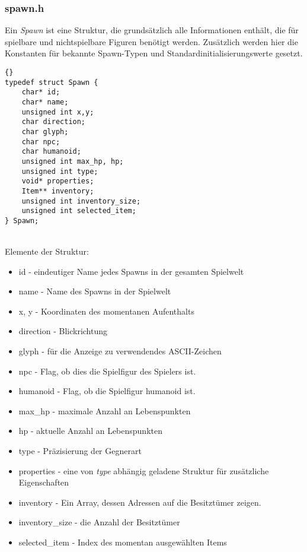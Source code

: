 \documentclass[11pt,a4paper,notitlepage]{report}
\begin{document}
	\newpage
	\subsubsection*{spawn.h}
	Ein \textit{Spawn} ist eine Struktur, die grundsätzlich alle Informationen enthält, die für spielbare und nichtspielbare Figuren benötigt werden. Zusätzlich werden hier die Konstanten für bekannte Spawn-Typen und Standardinitialisierungswerte gesetzt.	
	
	\begin{lstlisting}[caption=Spawn]{}
typedef struct Spawn {
	char* id;
	char* name;
	unsigned int x,y;
	char direction;
	char glyph;
	char npc;
	char humanoid;
	unsigned int max_hp, hp;
	unsigned int type;
	void* properties;
	Item** inventory;
	unsigned int inventory_size;
	unsigned int selected_item;
} Spawn;
		\end{lstlisting} \hspace*{\fill} \\
Elemente der Struktur:
		\begin{itemize}
			\item id - eindeutiger Name jedes Spawns in der gesamten Spielwelt
			\item name - Name des Spawns in der Spielwelt
			\item x, y - Koordinaten des momentanen Aufenthalts
			\item direction - Blickrichtung
			\item glyph - für die Anzeige zu verwendendes ASCII-Zeichen
			\item npc - Flag, ob dies die Spielfigur des Spielers ist.
			\item humanoid - Flag, ob die Spielfigur humanoid ist.
			\item max\_hp - maximale Anzahl an Lebenspunkten
			\item hp - aktuelle Anzahl an Lebenspunkten
			\item type - Präzisierung der Gegnerart
			\item properties - eine von \textit{type} abhängig geladene Struktur für zusätzliche Eigenschaften
			\item inventory - Ein Array, dessen Adressen auf die Besitztümer zeigen.
			\item inventory\_size - die Anzahl der Besitztümer
			\item selected\_item - Index des momentan ausgewählten Items
		\end{itemize}
		
\end{document}
